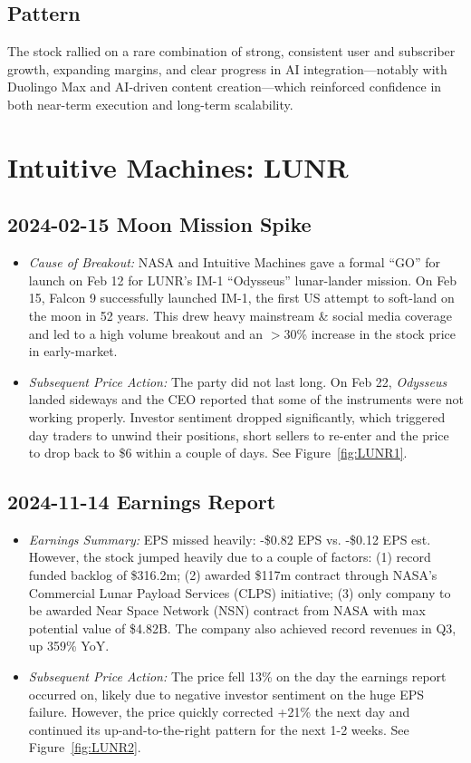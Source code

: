 \documentclass[11pt]{article}
\begin{document}
    \subsection{Pattern}
        The stock rallied on a rare combination of strong, consistent user and subscriber growth, expanding margins, and clear progress in AI integration—notably with Duolingo Max and AI-driven content creation—which reinforced confidence in both near-term execution and long-term scalability.  
\section{Intuitive Machines: LUNR}
    \subsection{2024-02-15 Moon Mission Spike}
        \begin{itemize}
            \item \textit{Cause of Breakout:} NASA and Intuitive Machines gave a formal ``GO'' for launch on Feb 12 for LUNR's IM-1 ``Odysseus'' lunar-lander mission. On Feb 15, Falcon 9 successfully launched IM-1, the first US attempt to soft-land on the moon in 52 years. This drew heavy mainstream \& social media coverage and led to a high volume breakout and an $>$30\% increase in the stock price in early-market.
            \item \textit{Subsequent Price Action:} The party did not last long. On Feb 22, \textit{Odysseus} landed sideways and the CEO reported that some of the instruments were not working properly. Investor sentiment dropped significantly, which triggered day traders to unwind their positions, short sellers to re-enter and the price to drop back to \$6 within a couple of days. See Figure~\ref{fig:LUNR1}.
        \end{itemize}
    \subsection{2024-11-14 Earnings Report}
        \begin{itemize}
            \item \textit{Earnings Summary:} EPS missed heavily: -\$0.82 EPS vs. -\$0.12 EPS est. However, the stock jumped heavily due to a couple of factors: (1) record funded backlog of \$316.2m; (2) awarded \$117m contract through NASA's Commercial Lunar Payload Services (CLPS) initiative; (3) only company to be awarded Near Space Network (NSN) contract from NASA with max potential value of \$4.82B. The company also achieved record revenues in Q3, up 359\% YoY.
            \item \textit{Subsequent Price Action:} The price fell 13\% on the day the earnings report occurred on, likely due to negative investor sentiment on the huge EPS failure. However, the price quickly corrected +21\% the next day and continued its up-and-to-the-right pattern for the next 1-2 weeks. See Figure~\ref{fig:LUNR2}.
        \end{itemize}
\end{document}
